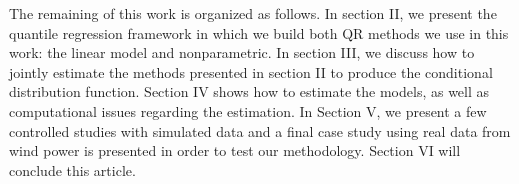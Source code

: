 


The remaining of this work is organized as follows. In section II, we present the quantile regression framework in which we build both QR methods we use in this work: the linear model and nonparametric. In section III, we discuss how to jointly estimate the methods presented in section II to produce the conditional distribution function. Section IV shows how to estimate the models, as well as computational issues regarding the estimation. In Section V, we present a few controlled studies with simulated data and a final case study using real data from wind power is presented in order to test our methodology. Section VI will conclude this article.
